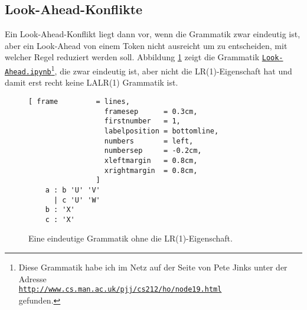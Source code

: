 \subsection{Look-Ahead-Konflikte}
Ein Look-Ahead-Konflikt liegt dann vor, wenn die Grammatik zwar eindeutig ist, aber ein Look-Ahead von einem
Token nicht ausreicht um zu entscheiden,  mit welcher Regel reduziert werden soll.  Abbildung 
\ref{fig:lr-conflict.g} zeigt die Grammatik 
\href{https://github.com/karlstroetmann/Formal-Languages/blob/master/Python/Chapter-10/Look-Ahead.ipynb}{\texttt{Look-Ahead.ipynb}}\footnote{ 
Diese Grammatik habe ich im Netz auf der Seite von Pete Jinks unter der Adresse
\\[0.1cm]
\hspace*{1.3cm}
\href{http://www.cs.man.ac.uk/~pjj/cs212/ho/node19.html}{\texttt{http://www.cs.man.ac.uk/pjj/cs212/ho/node19.html}}
\\[0.1cm]
gefunden.},
die zwar eindeutig ist, aber nicht die LR(1)-Eigenschaft hat und damit erst recht keine LALR(1) Grammatik ist.

\begin{figure}[!ht]
\centering
\begin{Verbatim}[ frame         = lines, 
                  framesep      = 0.3cm, 
                  firstnumber   = 1,
                  labelposition = bottomline,
                  numbers       = left,
                  numbersep     = -0.2cm,
                  xleftmargin   = 0.8cm,
                  xrightmargin  = 0.8cm,
                ]
    a : b 'U' 'V'
      | c 'U' 'W'
    b : 'X'
    c : 'X'   
\end{Verbatim}
\vspace*{-0.3cm}
\caption{Eine eindeutige Grammatik ohne die LR(1)-Eigenschaft.}
\label{fig:lr-conflict.g}
\end{figure}


